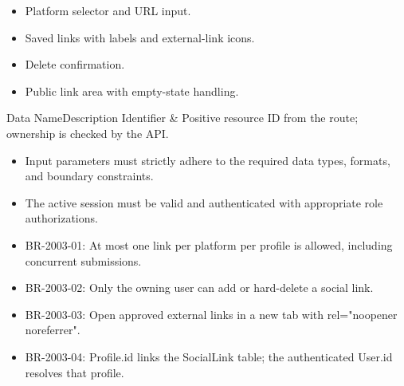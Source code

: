 \begin{itemize}[leftmargin=1.6em,topsep=3pt,itemsep=2pt,parsep=0pt,label=$\bullet$]
    \item Platform selector and URL input.
    \item Saved links with labels and external-link icons.
    \item Delete confirmation.
    \item Public link area with empty-state handling.
\end{itemize}


\begin{specdatatable}{Data Name}{Description}
Identifier & Positive resource ID from the route; ownership is checked by the API.\\ \hline
\end{specdatatable}

\begin{itemize}[leftmargin=1.6em,topsep=3pt,itemsep=2pt,parsep=0pt,label=$\bullet$]
    \item Input parameters must strictly adhere to the required data types, formats, and boundary constraints.
    \item The active session must be valid and authenticated with appropriate role authorizations.
\end{itemize}

\begin{itemize}[leftmargin=1.6em,topsep=3pt,itemsep=2pt,parsep=0pt,label=$\bullet$]\brrulelist
    \item BR-2003-01: At most one link per platform per profile is allowed, including concurrent submissions.
    \item BR-2003-02: Only the owning user can add or hard-delete a social link.
    \item BR-2003-03: Open approved external links in a new tab with rel="noopener noreferrer".
    \item BR-2003-04: Profile.id links the SocialLink table; the authenticated User.id resolves that profile.
\end{itemize}

